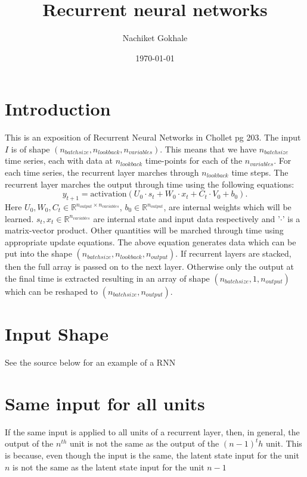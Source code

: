 \documentclass{article}
\newcommand{\beq}{\begin{equation}}
\newcommand{\eeq}{\end{equation}}
\begin{document}
\title{Recurrent neural networks}
\author{Nachiket Gokhale}
\date{\today}
\maketitle
\section{Introduction}
This is an exposition of Recurrent Neural Networks in Chollet pg 203. The input $I$ is of shape $(n_{batchsize},n_{lookback},n_{variables})$. This means that we have $n_{batchsize}$ time series, each with data at $n_{lookback}$ time-points for each of the $n_{variables}$. For each time series, the recurrent layer marches through $n_{lookback}$ time steps. The recurrent layer marches the output through time using the following equations:
\beq
y_{t+1} = \text{activation}(U_0\cdot{s_t} + W_0\cdot{x_t} + C_t\cdot{V_0} + b_{0}).
\eeq
Here $U_0,W_0,C_t \in \mathbb{R}^{n_{output}\times{n_{variables}}}$, $b_0 \in \mathbb{R}^{n_{output}}$, are internal weights which will be learned. $s_{t},x_{t} \in \mathbb{R}^{n_{variables}}$ are internal state and input data respectively and '$\cdot$' is a matrix-vector product. Other quantities will be marched through time using appropriate update equations. The above equation generates data which can be put into the shape $(n_{batchsize},n_{lookback},n_{output})$. If recurrent layers are stacked, then the full array is passed on to the next layer. Otherwise only the output at the final time is extracted resulting in an array of shape $(n_{batchsize},1,n_{output})$ which can be reshaped to $(n_{batchsize},n_{output})$.

\section{Input Shape}
See the source below for an example of a RNN
\begin{center}
  
\end{center}

\section{Same input for all units}
If the same input is applied to all units of a recurrent layer, then, in general, the output of the $n^{th}$ unit is not the same as the output of the $(n-1)^th$ unit. This is because, even though the input is the same, the latent state input for the unit $n$ is not the same as the latent state input for the unit $n-1$
 
\end{document}

